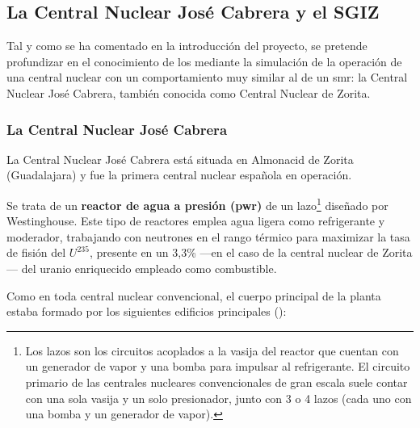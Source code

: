\subsection{La Central Nuclear José Cabrera y el SGIZ}

Tal y como se ha comentado en la introducción del proyecto, se pretende profundizar en el conocimiento de los  mediante la simulación de la operación de una central nuclear con un comportamiento muy similar al de un \acrshort{smr}: la Central Nuclear José Cabrera, también conocida como Central Nuclear de Zorita.

\subsubsection{La Central Nuclear José Cabrera}

La Central Nuclear José Cabrera está situada en Almonacid de Zorita (Guadalajara) y fue la primera central nuclear española en operación.

Se trata de un \textbf{reactor de agua a presión (\acrshort{pwr})} de un lazo\footnote{Los lazos son los circuitos acoplados a la vasija del reactor que cuentan con un generador de vapor y una bomba para impulsar al refrigerante. El circuito primario de las centrales nucleares convencionales de gran escala suele contar con una sola vasija y un solo presionador, junto con 3 o 4 lazos (cada uno con una bomba y un generador de vapor).} diseñado por Westinghouse. Este tipo de reactores emplea agua ligera como refrigerante y moderador, trabajando con neutrones en el rango térmico para maximizar la tasa de fisión del $U^{235}$, presente en un 3,3\% ---en el caso de la central nuclear de Zorita--- del uranio enriquecido empleado como combustible.

Como en toda central nuclear convencional, el cuerpo principal de la planta estaba formado por los siguientes edificios principales (\cite{documentacion_sgiz}):

